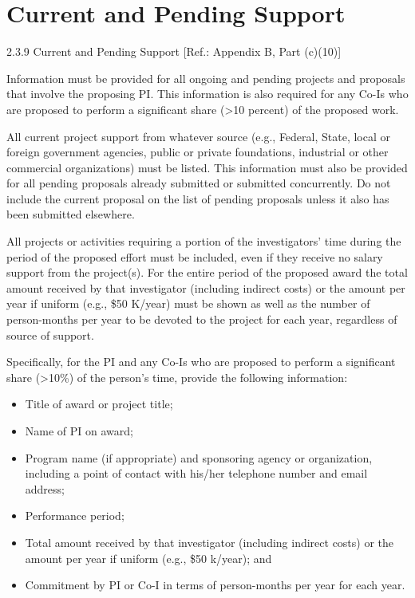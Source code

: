 \documentclass[12pt]{article}
\begin{document}
\cleardoublepage




\cleardoublepage

\section*{Current and Pending Support}
2.3.9 Current and Pending Support [Ref.: Appendix B, Part (c)(10)]

Information must be provided for all ongoing and pending projects and
proposals that involve the proposing PI. This information is also
required for any Co-Is who are proposed to perform a significant share
(>10 percent) of the proposed work.

All current project support from whatever source (e.g., Federal,
State, local or foreign government agencies, public or private
foundations, industrial or other commercial organizations) must be
listed. This information must also be provided for all pending
proposals already submitted or submitted concurrently. Do not include
the current proposal on the list of pending proposals unless it also
has been submitted elsewhere.

All projects or activities requiring a portion of the investigators'
time during the period of the proposed effort must be included, even
if they receive no salary support from the project(s). For the entire
period of the proposed award the total amount received by that
investigator (including indirect costs) or the amount per year if
uniform (e.g., \$50 K/year) must be shown as well as the number of
person-months per year to be devoted to the project for each year,
regardless of source of support.

Specifically, for the PI and any Co-Is who are proposed to perform a
significant share (>10\%) of the person's time, provide the following
information:
\begin{itemize}
\item Title of award or project title;
\item Name of PI on award;
\item Program name (if appropriate) and sponsoring agency or organization,
  including a point of contact with his/her telephone number and email
  address;
\item Performance period;
\item Total amount received by that investigator (including indirect
  costs) or the amount per year if uniform (e.g., \$50 k/year); and
\item Commitment by PI or Co-I in terms of person-months per year for each
  year.
\end{itemize}
\end{document}
